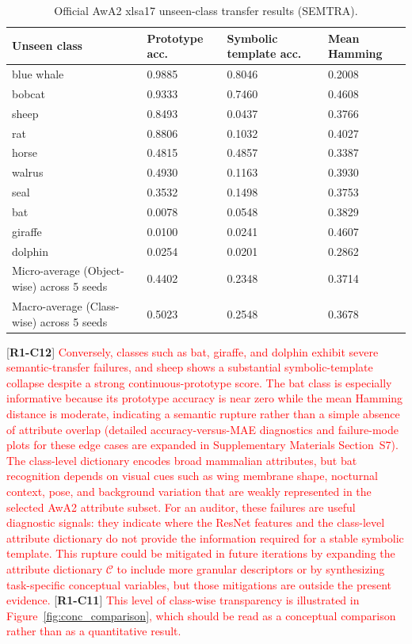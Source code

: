 \documentclass[make,article,submit,pdftex,moreauthors]{Definitions/mdpi}
\newcommand{\revtag}[2]{[\textbf{R#1-C#2}]}
\newcommand{\Rone}[1]{\textcolor{red}{#1}}
\begin{document}
\begin{table}[!ht]
\caption{Official AwA2 xlsa17 unseen-class transfer results (SEMTRA).\label{tab:protocol_b}}
\centering
\begin{tabularx}{\textwidth}{L l l l}
\toprule
\textbf{Unseen class} & \textbf{Prototype acc.} & \textbf{Symbolic template acc.} & \textbf{Mean Hamming} \\
\midrule
blue whale & 0.9885 & 0.8046 & 0.2008 \\
bobcat & 0.9333 & 0.7460 & 0.4608 \\
sheep & 0.8493 & 0.0437 & 0.3766 \\
rat & 0.8806 & 0.1032 & 0.4027 \\
horse & 0.4815 & 0.4857 & 0.3387 \\
walrus & 0.4930 & 0.1163 & 0.3930 \\
seal & 0.3532 & 0.1498 & 0.3753 \\
bat & 0.0078 & 0.0548 & 0.3829 \\
giraffe & 0.0100 & 0.0241 & 0.4607 \\
dolphin & 0.0254 & 0.0201 & 0.2862 \\
Micro-average (Object-wise) across 5 seeds & 0.4402 & 0.2348 & 0.3714 \\
Macro-average (Class-wise) across 5 seeds  & 0.5023 & 0.2548 & 0.3678 \\
\bottomrule
\end{tabularx}
\end{table}

\revtag{1}{12} \Rone{Conversely, classes such as bat, giraffe, and dolphin exhibit severe semantic-transfer failures, and sheep shows a substantial symbolic-template collapse despite a strong continuous-prototype score. The bat class is especially informative because its prototype accuracy is near zero while the mean Hamming distance is moderate, indicating a semantic rupture rather than a simple absence of attribute overlap (detailed accuracy-versus-MAE diagnostics and failure-mode plots for these edge cases are expanded in Supplementary Materials Section~S7). The class-level dictionary encodes broad mammalian attributes, but bat recognition depends on visual cues such as wing membrane shape, nocturnal context, pose, and background variation that are weakly represented in the selected AwA2 attribute subset. For an auditor, these failures are useful diagnostic signals: they indicate where the ResNet features and the class-level attribute dictionary do not provide the information required for a stable symbolic template. This rupture could be mitigated in future iterations by expanding the attribute dictionary $\mathcal{C}$ to include more granular descriptors or by synthesizing task-specific conceptual variables, but those mitigations are outside the present evidence.} \revtag{1}{11} \Rone{This level of class-wise transparency is illustrated in Figure~\ref{fig:conc_comparison}, which should be read as a conceptual comparison rather than as a quantitative result.}
\end{document}
